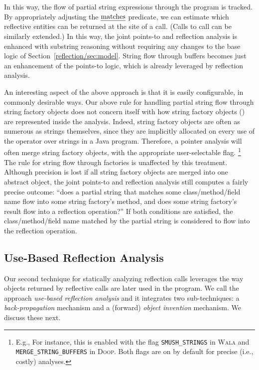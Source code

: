 In this way, the flow of partial string expressions through the
program is tracked. By appropriately adjusting the \(\text{\emph{matches}}\)
predicate, we can estimate which reflective entities can be returned at
the site of a  call. (Calls to  call can
be similarly extended.) In this way, the joint points-to and
reflection analysis is enhanced with substring reasoning without
requiring any changes to the base logic of
Section~\ref{reflection/sec:model}. String flow through buffers
becomes just an enhancement of the points-to logic, which is already
leveraged by reflection analysis.

An interesting aspect of the above approach is that it is easily
configurable, in commonly desirable ways. Our above rule for handling
partial string flow through string factory objects does not concern
itself with how string factory objects () are represented
inside the analysis. Indeed, string factory objects are often as
numerous as strings themselves, since they are implicitly allocated on
every use of the \code{+} operator over strings in a Java program.
Therefore, a pointer analysis will often merge string factory objects,
with the appropriate user-selectable flag.%
\footnote{E.g., For instance, this is enabled with the flag
  \texttt{SMUSH\_STRINGS} in \textsc{Wala} \cite{www:wala-reflection}
  and \texttt{MERGE\_STRING\_BUFFERS} in \textsc{Doop}.  Both flags
  are on by default for precise (i.e., costly) analyses.}
The rule for string flow through
factories is unaffected by this treatment. Although precision is lost
if all string factory objects are merged into one abstract object, the
joint points-to and reflection analysis still computes a fairly
precise outcome: ``does a partial string that matches some
class/method/field name flow into some string factory's 
method, and does some string factory's  result flow into
a reflection operation?'' If both conditions are satisfied, the
class/method/field name matched by the partial string is considered to
flow into the reflection operation.


\subsection{Use-Based Reflection Analysis}
\label{reflection/sec:use-based}

Our second technique for statically analyzing reflection calls
leverages the way objects returned by reflective calls are later used
in the program.  We call the approach \emph{use-based reflection
  analysis} and it integrates two sub-techniques: a
\emph{back-propagation} mechanism and a (forward) \emph{object
  invention} mechanism.  We discuss these next.


